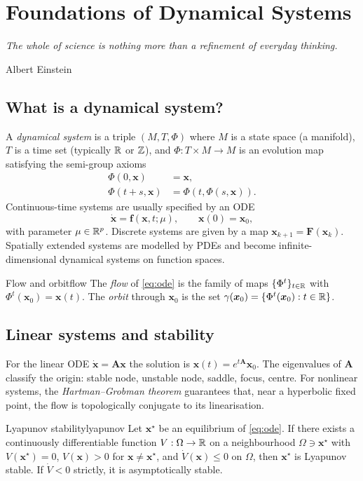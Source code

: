 \chapter{Foundations of Dynamical Systems}
\label{ch:foundations}

\epigraph{\itshape The whole of science is nothing more than a refinement of
everyday thinking.}{Albert Einstein}

\section{What is a dynamical system?}
A \emph{dynamical system} is a triple $(M,T,\Phi)$ where $M$ is a state
space (a manifold), $T$ is a time set (typically $\mathbb{R}$ or $\mathbb{Z}$), and
$\Phi:T\times M\to M$ is an evolution map satisfying the semi-group
axioms
\begin{align}
\Phi(0,\bm{x})&=\bm{x},\\
\Phi(t+s,\bm{x})&=\Phi(t,\Phi(s,\bm{x})).
\end{align}
Continuous-time systems are usually specified by an ODE
\begin{equation}
\dot{\bm{x}} = \bm{f}(\bm{x},t;\mu),\qquad \bm{x}(0)=\bm{x}_0,
\label{eq:ode}
\end{equation}
with parameter $\mu\in\mathbb{R}^p$. Discrete systems are given by a map
$\bm{x}_{k+1}=\bm{F}(\bm{x}_k)$. Spatially extended systems are modelled
by PDEs and become infinite-dimensional dynamical systems on
function spaces.

\begin{defn}{Flow and orbit}{flow}
The \emph{flow} of \cref{eq:ode} is the family of maps
$\{\Phi^t\}_{t\in\mathbb{R}}$ with $\Phi^t(\bm{x}_0)=\bm{x}(t)$. The
\emph{orbit} through $\bm{x}_0$ is the set
$\gamma(\bm{x}_0)=\{\Phi^t(\bm{x}_0):t\in\mathbb{R}\}$.
\end{defn}

\section{Linear systems and stability}
For the linear ODE $\dot{\bm{x}}=\bm{A}\bm{x}$ the solution is
$\bm{x}(t)=e^{t\bm{A}}\bm{x}_0$. The eigenvalues of $\bm{A}$ classify
the origin: stable node, unstable node, saddle, focus, centre. For
nonlinear systems, the \emph{Hartman--Grobman theorem} guarantees that,
near a hyperbolic fixed point, the flow is topologically conjugate to
its linearisation.

\begin{thm}{Lyapunov stability}{lyapunov}
Let $\bm{x}^\star$ be an equilibrium of \cref{eq:ode}. If there exists
a continuously differentiable function $V:\Omega\to\mathbb{R}$ on a neighbourhood
$\Omega\ni\bm{x}^\star$ with $V(\bm{x}^\star)=0$, $V(\bm{x})>0$ for
$\bm{x}\neq\bm{x}^\star$, and $\dot V(\bm{x})\le 0$ on $\Omega$, then
$\bm{x}^\star$ is Lyapunov stable. If $\dot V<0$ strictly, it is
asymptotically stable.
\end{thm}

